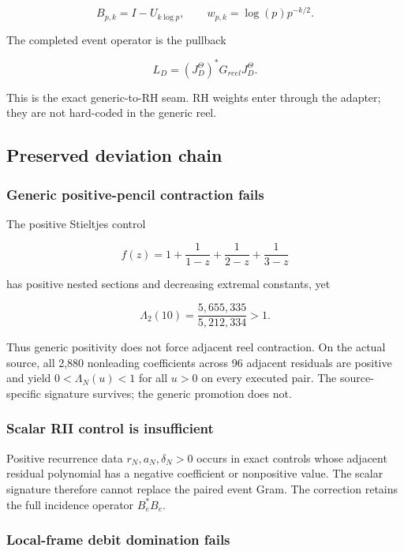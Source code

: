 \[
B_{p,k}=I-U_{k\log p},
\qquad
w_{p,k}=\log(p)p^{-k/2}.
\]

The completed event operator is the pullback

\[
L_D=(J_D^\Theta)^*G_{reel}J_D^\Theta.
\]

This is the exact generic-to-RH seam. RH weights enter through the
adapter; they are not hard-coded in the generic reel.

\subsection{Preserved deviation chain}\label{viii-ch06-preserved-deviation-chain}

\subsubsection{Generic positive-pencil contraction
fails}\label{viii-ch06-generic-positive-pencil-contraction-fails}

The positive Stieltjes control

\[
f(z)=1+\frac1{1-z}+\frac1{2-z}+\frac1{3-z}
\]

has positive nested sections and decreasing extremal constants, yet

\[
\Lambda_2(10)=\frac{5{,}655{,}335}{5{,}212{,}334}>1.
\]

Thus generic positivity does not force adjacent reel contraction. On the
actual source, all 2,880 nonleading coefficients across 96 adjacent
residuals are positive and yield \(0<\Lambda_N(u)<1\) for all \(u>0\) on
every executed pair. The source-specific signature survives; the generic
promotion does not.

\subsubsection{Scalar RII control is
insufficient}\label{viii-ch06-scalar-rii-control-is-insufficient}

Positive recurrence data \(r_N,a_N,\delta_N>0\) occurs in exact controls
whose adjacent residual polynomial has a negative coefficient or
nonpositive value. The scalar signature therefore cannot replace the
paired event Gram. The correction retains the full incidence operator
\(B_e^*B_e\).

\subsubsection{Local-frame debit domination
fails}\label{viii-ch06-local-frame-debit-domination-fails}

